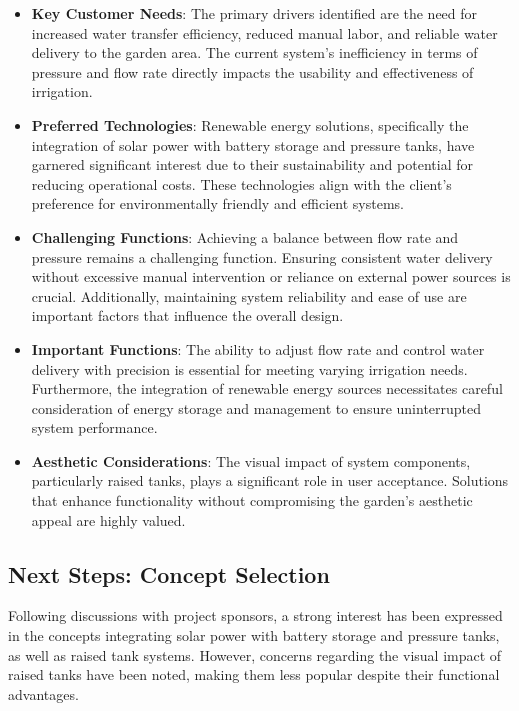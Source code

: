 \documentclass[12pt]{report}
\begin{document}
\begin{itemize}
    \item \textbf{Key Customer Needs}: The primary drivers identified are the need for increased water transfer efficiency, reduced manual labor, and reliable water delivery to the garden area. The current system's inefficiency in terms of pressure and flow rate directly impacts the usability and effectiveness of irrigation.
    
    \item \textbf{Preferred Technologies}: Renewable energy solutions, specifically the integration of solar power with battery storage and pressure tanks, have garnered significant interest due to their sustainability and potential for reducing operational costs. These technologies align with the client's preference for environmentally friendly and efficient systems.
    
    \item \textbf{Challenging Functions}: Achieving a balance between flow rate and pressure remains a challenging function. Ensuring consistent water delivery without excessive manual intervention or reliance on external power sources is crucial. Additionally, maintaining system reliability and ease of use are important factors that influence the overall design.
    
    \item \textbf{Important Functions}: The ability to adjust flow rate and control water delivery with precision is essential for meeting varying irrigation needs. Furthermore, the integration of renewable energy sources necessitates careful consideration of energy storage and management to ensure uninterrupted system performance.
    
    \item \textbf{Aesthetic Considerations}: The visual impact of system components, particularly raised tanks, plays a significant role in user acceptance. Solutions that enhance functionality without compromising the garden's aesthetic appeal are highly valued.
\end{itemize}

\subsection{Next Steps: Concept Selection}

Following discussions with project sponsors, a strong interest has been expressed in the concepts integrating solar power with battery storage and pressure tanks, as well as raised tank systems. However, concerns regarding the visual impact of raised tanks have been noted, making them less popular despite their functional advantages.
\end{document}
